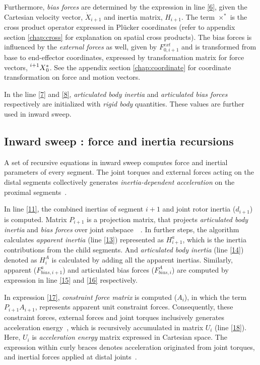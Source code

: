 Furthermore, \textit{bias forces} are determined by the expression in line \ref{6}, given the Cartesian velocity vector, $\dot{X}_{i+1}$ and inertia matrix, $H_{i+1}$. The term $\times^*$ is the cross product operator expressed in Pl{\"u}cker coordinates (refer to appendix section \ref{chap:cross} for explanation on spatial cross products). The bias forces is influenced by the \textit{external forces} as well, given by $F^{ext}_{0, i+1}$ and is transformed from base to end-effector coordinates, expressed by transformation matrix for force vectors, $\prescript{i+1}{}{X}_0^*$. See the appendix section \ref{chap:coordinate} for coordinate transformation on force and motion vectors.

In the line \ref{7} and \ref{8}, \textit{articulated body inertia} and \textit{articulated bias forces} respectively are initialized with \textit{rigid body} quantities. These values are further used in inward sweep.

\subsection{Inward sweep : force and inertia recursions} \label{inward-sweep}

A set of recursive equations in inward sweep computes force and inertial parameters of every segment. The joint torques and external forces acting on the distal segments collectively generates \textit{inertia-dependent acceleration} on the proximal segments~\cite{shakhimardanov2015composable}.


In line \ref{11}, the combined inertias of segment $i+1$ and joint rotor inertia ($d_{i+1}$) is computed. Matrix $P_{i+1}$ is a projection matrix, that projects \textit{articulated body inertia} and \textit{bias forces} over joint subspace~\cite{shakhimardanov2015composable}~\cite{vukcevic2018extending}. In further steps, the algorithm calculates \textit{apparent inertia} (line \ref{13}) represented as $H^a_{i+1}$, which is the inertia contributions from the child segments. And \textit{articulated body inertia} (line \ref{14}) denoted as $H^A_{i}$ is calculated by adding all the apparent inertias. Similarly, apparent ($F^a_{bias, i+1}$) and articulated bias forces ($F^A_{bias, i}$) are computed by expression in line \ref{15} and \ref{16} respectively.

In expression \ref{17}, \textit{constraint force matrix} is computed ($A_i$), in which the term $P_{i+1} A_{i+1}$, represents apparent unit constraint forces. Consequently, these constraint forces, external forces and joint torques inclusively generates acceleration energy~\cite{shakhimardanov2015composable}, which is recursively accumulated in matrix $U_i$ (line \ref{18}). Here, $U_i$ is \textit{acceleration energy} matrix expressed in Cartesian space. The expression within curly braces denotes acceleration originated from joint torques, and inertial forces applied at distal joints~\cite{shakhimardanov2015composable}.

